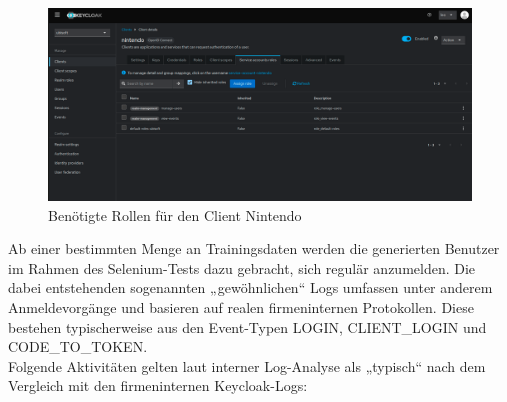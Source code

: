 \documentclass[a4paper,12pt]{article}
\begin{document}
	\begin{figure}[H]
		\centering
		\includegraphics[width=0.9\linewidth]{Bilder/screenshot012}
		\caption{Benötigte Rollen für den Client Nintendo}
		\label{fig:screenshot012}
	\end{figure}
	Ab einer bestimmten Menge an Trainingsdaten werden die generierten Benutzer im Rahmen des Selenium-Tests dazu gebracht, sich regulär anzumelden. Die dabei entstehenden sogenannten „gewöhnlichen“ Logs umfassen unter anderem Anmeldevorgänge und basieren auf realen firmeninternen Protokollen. Diese bestehen typischerweise aus den Event-Typen LOGIN, CLIENT\_LOGIN und CODE\_TO\_TOKEN.
	\\[0.5em]
	Folgende Aktivitäten gelten laut interner Log-Analyse als „typisch“ nach dem Vergleich mit den firmeninternen Keycloak-Logs:
	
\end{document}
